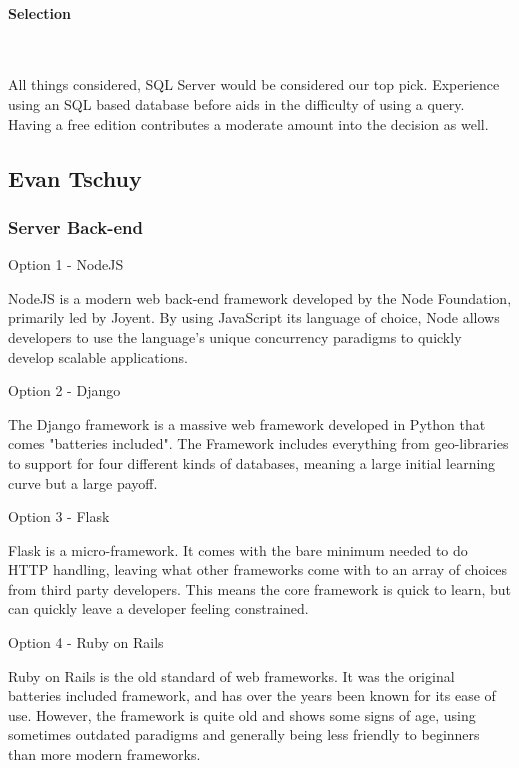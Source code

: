 \documentclass[letterpaper, 10pt, draftclsnofoot, compsoc, onecolumn]{IEEEtran}
\begin{document}
{\medskip
\paragraph{Selection} ~\\
{\noindent All things considered, SQL Server would be considered our top pick. Experience using an SQL based database before aids in the difficulty of using a query. Having a free edition contributes a moderate amount into the decision as well.\par}

\medskip








\newpage
\subsection{Evan Tschuy}
\vspace{1pc}
\subsubsection{Server Back-end}
{\noindent Option 1 - NodeJS \par}
{\noindent NodeJS is a modern web back-end framework developed by the Node Foundation,
primarily led by Joyent. By using JavaScript its language of choice, Node allows
developers to use the language's unique concurrency paradigms to quickly develop
scalable applications. \par}
{\noindent Option 2 - Django \par}
{\noindent The Django framework is a massive web framework developed in Python that comes "batteries
included". The Framework includes everything from geo-libraries to support for four different kinds of
databases, meaning a large initial learning curve but a large payoff. \par}
{\noindent Option 3 - Flask \par}
{\noindent Flask is a micro-framework. It comes with the bare minimum needed to do HTTP handling, leaving
what other frameworks come with to an array of choices from third party developers. This means the core
framework is quick to learn, but can quickly leave a developer feeling constrained. \par}
{\noindent Option 4 - Ruby on Rails \par}
{\noindent Ruby on Rails is the old standard of web frameworks. It was the original batteries included
framework, and has over the years been known for its ease of use. However, the framework is quite old
and shows some signs of age, using sometimes outdated paradigms and generally being less friendly to beginners
than more modern frameworks. \par}

}
\end{document}

